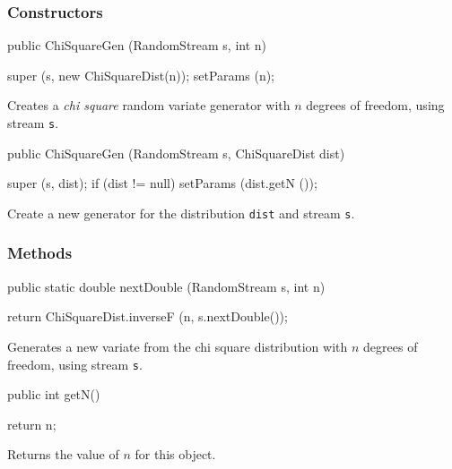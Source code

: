 \subsubsection* {Constructors}
\begin{code}

   public ChiSquareGen (RandomStream s, int n) \begin{hide} {
      super (s, new ChiSquareDist(n));
      setParams (n);
   }\end{hide}
\end{code} 
\begin{tabb}  Creates a \emph{chi square}  random variate generator with 
 $n$ degrees of freedom, using stream \texttt{s}. 
\end{tabb}
\begin{code}
 
   public ChiSquareGen (RandomStream s, ChiSquareDist dist) \begin{hide} {
      super (s, dist);
      if (dist != null)
         setParams (dist.getN ());
   }\end{hide}
\end{code}
  \begin{tabb}  Create a new generator for the distribution \texttt{dist}
    and stream \texttt{s}. 
  \end{tabb}

\subsubsection* {Methods}
\begin{code}

   public static double nextDouble (RandomStream s, int n) \begin{hide} {
      return ChiSquareDist.inverseF (n, s.nextDouble());
   }
\end{hide}
\end{code}
 \begin{tabb}  Generates a new variate from the chi square distribution 
   with $n$ degrees of freedom, using stream \texttt{s}.
 \end{tabb}
\begin{code} 
     
   public int getN()\begin{hide} {
      return n;
   }
\end{hide}
\end{code}
\begin{tabb}
  Returns the value of $n$ for this object.
\end{tabb}
\begin{hide}\begin{code} 
     
   protected void setParams (int n) {
      if (n <= 0)
         throw new IllegalArgumentException ("n <= 0");
      this.n = n;
   }
}
\end{code}
\end{hide}
